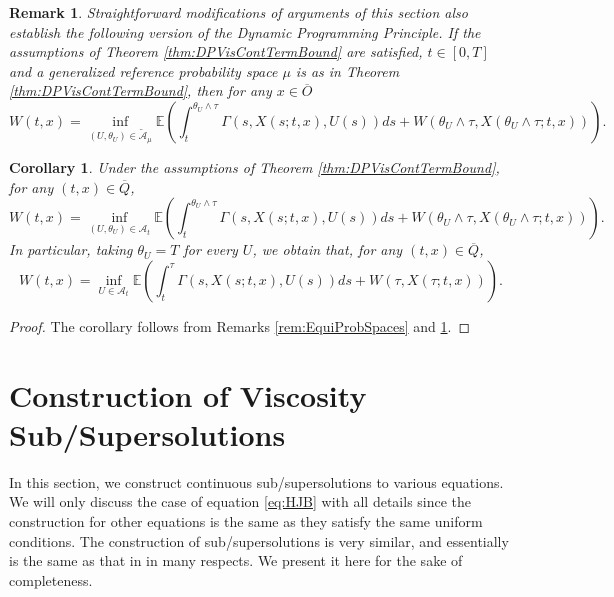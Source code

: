 \documentclass[amscd,amssymb,11pt]{article}
\newtheorem{corollary}[theorem]{Corollary}
\newtheorem{remark}[theorem]{Remark}
\numberwithin{theorem}{section}
\numberwithin{equation}{section}
\let\Section=\section
\def\section{\setcounter{equation}{0}\Section}\sf
\begin{document}
\begin{remark}\label{rem:ImprovDPFgeneral}
Straightforward modifications of arguments of this section also establish the following version of the Dynamic Programming Principle. If the assumptions of Theorem \ref{thm:DPVisContTermBound} are satisfied, $t\in[0,T]$ and a generalized reference probability space $\mu$ is as in Theorem \ref{thm:DPVisContTermBound}, then for any $x\in\overline{O}$
\begin{equation*}
W(t,x)=\inf_{(U,\theta_{U})\in\widetilde{\mathcal{A}}_{\mu}}\mathbb{E}\left(\int_{t}^{\theta_{U}\wedge\tau}\Gamma\left(s,X(s;t,x),U(s)\right)ds+W\left(\theta_{U}\wedge\tau,X(\theta_{U}\wedge\tau;t,x)\right)\right).
\end{equation*}
\end{remark}
\begin{corollary}\label{cor:final}
Under the assumptions of Theorem \ref{thm:DPVisContTermBound}, for any $(t,x)\in \overline{Q}$,
\begin{equation*}
W(t,x)=\inf_{(U,\theta_{U})\in\mathcal{A}_{t}}\mathbb{E}\left(\int_{t}^{\theta_{U}\wedge\tau}\Gamma\left(s,X(s;t,x),U(s)\right)ds+W\left(\theta_{U}\wedge\tau,X(\theta_{U}\wedge\tau;t,x)\right)\right).
\end{equation*}
In particular, taking $\theta_{U}=T$ for every $U$, we obtain that, for any $(t,x)\in \overline{Q}$,
\begin{equation*}
W(t,x)=\inf_{U\in\mathcal{A}_{t}}\mathbb{E}\left(\int_{t}^{\tau}\Gamma\left(s,X(s;t,x),U(s)\right)ds+W\left(\tau,X(\tau;t,x)\right)\right).
\end{equation*}
\end{corollary}
\begin{proof}
The corollary follows from Remarks \ref{rem:EquiProbSpaces} and \ref{rem:ImprovDPFgeneral}.
\end{proof}



\section{Construction of Viscosity Sub/Supersolutions}\label{sec:VisConstrn}



In this section, we construct continuous sub/supersolutions to various equations. We will only discuss the case of equation \eqref{eq:HJB} with all details since the construction for other equations is the same as they satisfy the same uniform conditions. The construction of sub/supersolutions is very similar, and essentially is the same as that in \cite{Mou1:2016} in many respects. We present it here for the sake of completeness.
\end{document}
